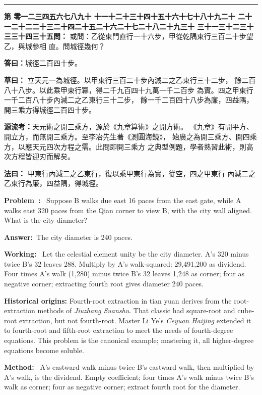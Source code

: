 \documentclass[9pt,a4paper]{article}
\newcounter{probnum}
\newcounter{overallnum}
\newcommand{\chnum}[1]{%
  \ifcase#1 零\or 一\or 二\or 三\or 四\or 五\or 六\or 七\or 八\or 九\or 十\or
    十一\or 十二\or 十三\or 十四\or 十五\or 十六\or 十七\or 十八\or 十九\or 二十\or
    二十一\or 二十二\or 二十三\or 二十四\or 二十五\or 二十六\or 二十七\or 二十八\or 二十九\or 三十\or
    三十一\or 三十二\or 三十三\or 三十四\or 三十五\fi}
\newcommand{\problem}[1]{\stepcounter{probnum}\stepcounter{overallnum}\par\noindent\textbf{\color{volcolor}第\chnum{\value{probnum}}問：}#1\par\vspace{0.15cm}}
\newcommand{\answer}[1]{\par\noindent\textbf{答曰：}#1\par\vspace{0.15cm}}
\newcommand{\working}[1]{\par\noindent\textbf{草曰：}#1\par\vspace{0.15cm}}
\newcommand{\method}[1]{\par\noindent\textbf{法曰：}#1\par\vspace{0.25cm}}
\newcommand{\eproblem}[1]{\par\noindent\textbf{\color{volcolor}Problem~\theoverallnum:}~#1\par\vspace{0.15cm}}
\newcommand{\eanswer}[1]{\par\noindent\textbf{Answer:}~#1\par\vspace{0.15cm}}
\newcommand{\eworking}[1]{\par\noindent\textbf{Working:}~#1\par\vspace{0.15cm}}
\newcommand{\emethod}[1]{\par\noindent\textbf{Method:}~#1\par\vspace{0.25cm}}
\begin{document}
\vspace{0.15cm}
\noindent\rule{\textwidth}{0.2pt}
\vspace{0.15cm}

\noindent\begin{minipage}[t]{0.48\textwidth}
\problem{
或問：乙從東門直行一十六步，甲從乾隅東行三百二十步望乙，與城參相
直。問城徑幾何？
}

\answer{城徑二百四十步。}

\working{
立天元一為城徑。以甲東行三百二十步內減二之乙東行三十二步，
餘二百八十八步。以此乘甲東行冪，得二千九百四十九萬一千二百步
為實。四之甲東行一千二百八十步內減二之乙東行三十二步，
餘一千二百四十八步為廉，四益隅，開三乘方得城徑二百四十步。

\textbf{源流考：}天元術之開三乘方，源於《九章算術》之開方術。
《九章》有開平方、開立方，而無開三乘方。至李冶先生著《測圓海鏡》，
始廣之為開三乘方、開四乘方，以應天元四次方程之需。此問即開三乘方
之典型例題，學者熟習此術，則高次方程皆迎刃而解矣。
}

\method{
甲東行內減二之乙東行，復以乘甲東行為實，從空，四之甲東行
內減二之乙東行為廉，四益隅，得城徑。
}
\end{minipage}%
\hfill%
\begin{minipage}[t]{0.50\textwidth}
\eproblem{
Suppose B walks due east 16 paces from the east gate, while A walks east 320
paces from the Qian corner to view B, with the city wall aligned. What is
the city diameter?
}

\eanswer{The city diameter is 240 paces.}

\eworking{
Let the celestial element unity be the city diameter. A's 320 minus twice
B's 32 leaves 288. Multiply by A's walk-squared: 29,491,200 as dividend.
Four times A's walk (1,280) minus twice B's 32 leaves 1,248 as corner;
four as negative corner; extracting fourth root gives diameter 240 paces.

\textbf{Historical origins:} Fourth-root extraction in tian yuan derives from
the root-extraction methods of \textit{Jiuzhang Suanshu}. That classic had
square-root and cube-root extraction, but not fourth-root. Master Li Ye's
\textit{Ceyuan Haijing} extended it to fourth-root and fifth-root extraction
to meet the needs of fourth-degree equations. This problem is the canonical
example; mastering it, all higher-degree equations become soluble.
}

\emethod{
A's eastward walk minus twice B's eastward walk, then multiplied by A's walk,
is the dividend. Empty coefficient; four times A's walk minus twice B's walk
as corner; four as negative corner; extract fourth root for the diameter.
}
\end{minipage}
\vspace{0.15cm}
\end{document}
